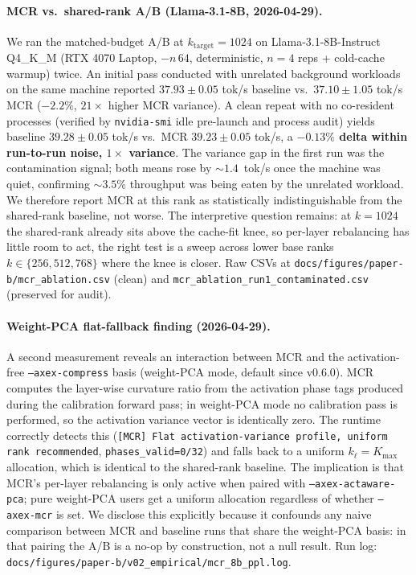 \documentclass[11pt]{article}
\begin{document}
\paragraph{MCR vs.\ shared-rank A/B (Llama-3.1-8B, 2026-04-29).}
We ran the matched-budget A/B at $k_\text{target}{=}1024$ on
Llama-3.1-8B-Instruct Q4\_K\_M (RTX 4070 Laptop, $-n\,64$, deterministic,
$n{=}4$ reps + cold-cache warmup) twice. An initial pass conducted with
unrelated background workloads on the same machine reported
$37.93\pm 0.05$ tok/s baseline vs.\ $37.10\pm 1.05$ tok/s MCR
($-2.2\%$, $21\times$ higher MCR variance). A clean repeat with no
co-resident processes (verified by \texttt{nvidia-smi} idle pre-launch
and process audit) yields baseline $39.28\pm 0.05$ tok/s vs.\ MCR
$39.23\pm 0.05$ tok/s, a \textbf{$-0.13\%$ delta within run-to-run
noise, $1{\times}$ variance}. The variance gap in the first run was
the contamination signal; both means rose by $\sim 1.4$~tok/s once the
machine was quiet, confirming $\sim 3.5\%$ throughput was being eaten
by the unrelated workload. We therefore report MCR at this rank as
statistically indistinguishable from the shared-rank baseline,
not worse. The interpretive question remains: at $k{=}1024$ the
shared-rank already sits above the cache-fit knee, so per-layer
rebalancing has little room to act, the right test is a sweep across
lower base ranks $k{\in}\{256, 512, 768\}$ where the knee is closer.
Raw CSVs at \texttt{docs/figures/paper-b/mcr\_ablation.csv} (clean) and
\texttt{mcr\_ablation\_run1\_contaminated.csv} (preserved for audit).

\paragraph{Weight-PCA flat-fallback finding (2026-04-29).}
A second measurement reveals an interaction between MCR and the
activation-free \texttt{--axex-compress} basis (weight-PCA mode, default
since v0.6.0). MCR computes the layer-wise curvature ratio from the
activation phase tags produced during the calibration forward pass; in
weight-PCA mode no calibration pass is performed, so the activation
variance vector is identically zero. The runtime correctly detects this
(\texttt{[MCR] Flat activation-variance profile, uniform rank
recommended}, \texttt{phases\_valid=0/32}) and falls back to a uniform
$k_\ell{=}K_\text{max}$ allocation, which is identical to the
shared-rank baseline. The implication is that MCR's per-layer
rebalancing is only active when paired with
\texttt{--axex-actaware-pca}; pure weight-PCA users get a uniform
allocation regardless of whether \texttt{--axex-mcr} is set. We disclose
this explicitly because it confounds any naive comparison between MCR
and baseline runs that share the weight-PCA basis: in that pairing the
A/B is a no-op by construction, not a null result. Run log:
\texttt{docs/figures/paper-b/v02\_empirical/mcr\_8b\_ppl.log}.
\end{document}
